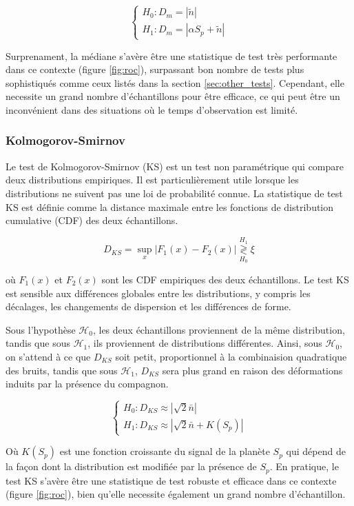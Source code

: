 \documentclass{article}
\begin{document}
$$
\begin{cases}
H_0 : D_m = |\tilde{n}|\\
H_1 : D_m =  | \alpha S_p + \tilde{n} |
\end{cases}
$$

Surprenament, la médiane s'avère être une statistique de test très performante dans ce contexte (figure \ref{fig:roc}), surpassant bon nombre de tests plus sophistiqués comme ceux listés dans la section \ref{sec:other_tests}. Cependant, elle necessite un grand nombre d'échantillons pour être efficace, ce qui peut être un inconvénient dans des situations où le temps d'observation est limité.

\subsubsection{Kolmogorov-Smirnov}

Le test de Kolmogorov-Smirnov (KS) est un test non paramétrique qui compare deux distributions empiriques. Il est particulièrement utile lorsque les distributions ne suivent pas une loi de probabilité connue. La statistique de test KS est définie comme la distance maximale entre les fonctions de distribution cumulative (CDF) des deux échantillons.

$$
D_{KS} = \sup_x |F_1(x) - F_2(x)| \stackrel{H_1}{\underset{H_0}{\gtrless}} \xi
$$

où $F_1(x)$ et $F_2(x)$ sont les CDF empiriques des deux échantillons. Le test KS est sensible aux différences globales entre les distributions, y compris les décalages, les changements de dispersion et les différences de forme.

Sous l'hypothèse $\mathcal{H}_0$, les deux échantillons proviennent de la même distribution, tandis que sous $\mathcal{H}_1$, ils proviennent de distributions différentes. Ainsi, sous $\mathcal{H}_0$, on s'attend à ce que $D_{KS}$ soit petit, proportionnel à la combinaision quadratique des bruits, tandis que sous $\mathcal{H}_1$, $D_{KS}$ sera plus grand en raison des déformations induits par la présence du compagnon.

$$
\begin{cases}
H_0 : D_{KS} \approx |\sqrt{2}\bar{n}|\\
H_1 : D_{KS} \approx |\sqrt{2}\bar{n} + K(S_p)|
\end{cases}
$$

Où $K(S_p)$ est une fonction croissante du signal de la planète $S_p$ qui dépend de la façon dont la distribution est modifiée par la présence de $S_p$. En pratique, le test KS s'avère être une statistique de test robuste et efficace dans ce contexte (figure \ref{fig:roc}), bien qu'elle necessite également un grand nombre d'échantillon.
\end{document}
